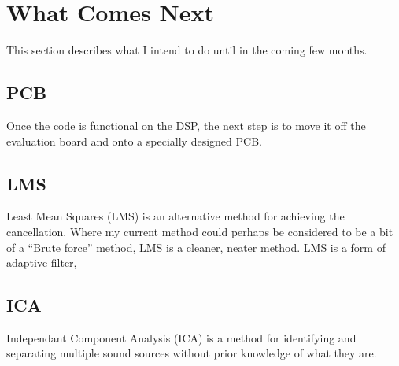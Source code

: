 \newpage
\section{What Comes Next}

This section describes what I intend to do until in the coming few months.

\subsection{PCB}
Once the code is functional on the DSP, the next step is to move it off the evaluation board and onto a specially designed PCB.

\subsection{LMS}
Least Mean Squares (LMS) is an alternative method for achieving the cancellation.
Where my current method could perhaps be considered to be a bit of a ``Brute force'' method, LMS is a cleaner, neater method.
LMS is a form of adaptive filter,

\subsection{ICA}
Independant Component Analysis (ICA) is a method for identifying and separating multiple sound sources without prior knowledge of what they are.
